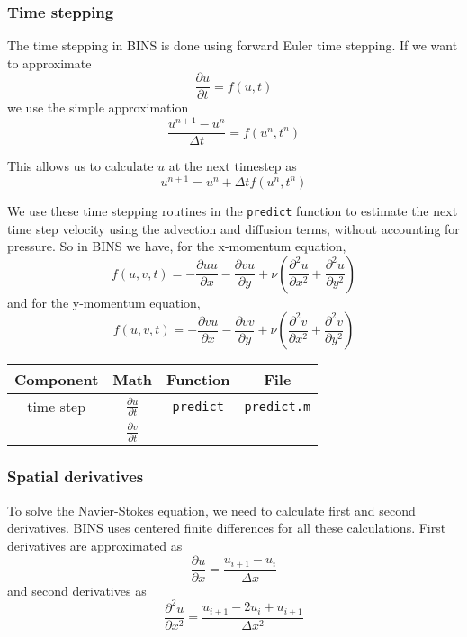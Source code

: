 \documentclass[12pt]{article}
\begin{document}
\subsubsection{Time stepping}
The time stepping in BINS is done using forward Euler time stepping.  If we want to approximate 
\[ \frac{\partial u}{\partial t} = f(u,t) \]
we use the simple approximation
\[ \frac{u^{n+1}-u^n}{\Delta t} = f(u^n,t^n)\]

This allows us to calculate $u$ at the next timestep as
\begin{equation}
u^{n+1} = u^n + \Delta t f(u^n,t^n)
\end{equation}

We use these time stepping routines in the \texttt{predict} function to estimate the next time step velocity using the advection and diffusion terms, without accounting for pressure.  So in BINS we have, for the x-momentum equation,
\[ f(u,v,t) = -\frac{\partial u u}{\partial x}-\frac{\partial v u}{\partial y} + \nu\left( \frac{\partial^2 u}{\partial x^2} + \frac{\partial^2 u}{\partial y^2} \right) \]
and for the y-momentum equation,
\[ f(u,v,t) = -\frac{\partial v u}{\partial x}-\frac{\partial v v}{\partial y} + \nu\left( \frac{\partial^2 v}{\partial x^2} + \frac{\partial^2 v}{\partial y^2} \right) \]

\begin{center}
\begin{tabular}{|c|c|c|c|}
\hline 
\bf{Component} & \bf{Math} & \bf{Function} & \bf{File}\\ 
\hline 
time step & \Large{$\frac{\partial u}{\partial t}$} & \texttt{predict}& \texttt{predict.m} \\ 
 & \Large{$\frac{\partial v}{\partial t}$} &  &   \\ 
\hline 
\end{tabular} 
\end{center}

\subsubsection{Spatial derivatives}
To solve the Navier-Stokes equation, we need to calculate first and second derivatives.  BINS uses centered finite differences for all these calculations.  First derivatives are approximated as
\begin{equation}
\label{firstDeriv}
\frac{\partial u}{\partial x} = \frac{u_{i+1} - u_{i}}{\Delta x}
\end{equation}
and second derivatives as
\begin{equation}
\label{secondDeriv}
\frac{\partial^2 u}{\partial x^2} = \frac{u_{i+1} -2 u_i + u_{i+1}}{\Delta x^2}
\end{equation} 
\end{document}
